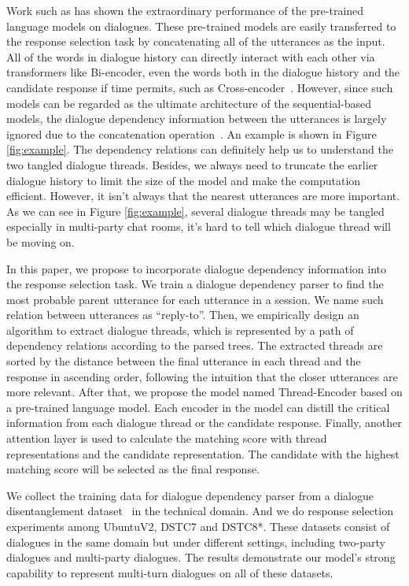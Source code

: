  
Work such as \cite{abs-1908-04812,vig2019comparison} has shown the 
extraordinary performance of the pre-trained language models on dialogues. 
These pre-trained models are easily transferred to the response selection 
task by concatenating all of the utterances as the input. 
All of the words in dialogue history can directly interact with each other 
via transformers like Bi-encoder, even the words both in the dialogue history 
and the candidate response if time permits, such as Cross-encoder~\cite{humeau2019poly}. 
However, since such models can be regarded as the ultimate 
architecture of the sequential-based models, the dialogue dependency 
information between the utterances is largely ignored due to the 
concatenation operation~\cite{WuWXZL17}. An example is shown in Figure \ref{fig:example}. The dependency relations can definitely help us to understand the two tangled dialogue threads.
Besides, we always need to truncate the earlier dialogue history 
to limit the size of the model and make the computation efficient. 
However, it isn't always that the nearest utterances are more important. 
As we can see in Figure \ref{fig:example}, several dialogue threads may 
be tangled especially in multi-party chat rooms, 
it's hard to tell which dialogue thread will be moving on.

In this paper, we propose to incorporate dialogue dependency information 
into the response selection task. 
We train a dialogue dependency parser
to find the most probable parent utterance for each utterance in a session. We name such relation between utterances as ``reply-to''.
Then, we empirically design an algorithm to extract dialogue threads, which is represented by a path of dependency relations according to the parsed trees.
The extracted threads are sorted by the distance between the final utterance in each 
thread and the response in ascending order, following the intuition that the closer utterances are more relevant.
After that, we propose the model named Thread-Encoder based on a pre-trained language 
model.
Each encoder in the model can distill the critical information from each dialogue thread or the candidate response. 
Finally, another attention layer is used to calculate the matching score 
with thread representations and the candidate representation. The candidate with the highest matching score will be selected as the final response.

We collect the training data for dialogue dependency parser from a dialogue 
disentanglement dataset~\cite{KummerfeldGPAGG19} in the technical domain. 
And we do response selection experiments among UbuntuV2, DSTC7 and DSTC8*. 
These datasets consist of dialogues in the same domain but under different settings, 
including two-party dialogues and multi-party dialogues. 
The results demonstrate our model's strong capability to represent multi-turn
dialogues on all of these datasets.

